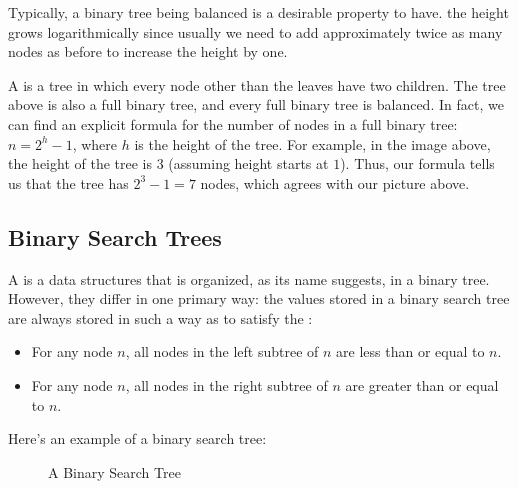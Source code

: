 Typically, a binary tree being balanced is a desirable property to have. the height grows logarithmically since usually we need to add approximately twice as many nodes as before to increase the height by one. 


A  is a tree in which every node other than the leaves have two children. The tree above is also a full binary tree, and every full binary tree is balanced. In fact, we can find an explicit formula for the number of nodes in a full binary tree: $n = 2^{h} - 1$, where $h$ is the height of the tree. For example, in the image above, the height of the tree is $3$ (assuming height starts at $1$). Thus, our formula tells us that the tree has $2^{3} - 1 = 7$ nodes, which agrees with our picture above. 

\subsection{Binary Search Trees}

A  is a data structures that is organized, as its name suggests, in a binary tree. However, they differ in one primary way: the values stored in a binary search tree are always stored in such a way as to satisfy the :

\begin{itemize}
    \item For any node $n$, all nodes in the left subtree of $n$ are less than or equal to $n$.
    \item For any node $n$, all nodes in the right subtree of $n$ are greater than or equal to $n$. 
\end{itemize}

Here's an example of a binary search tree:

\begin{figure}[h]
\centering
{}
\caption{A Binary Search Tree}
\end{figure}

